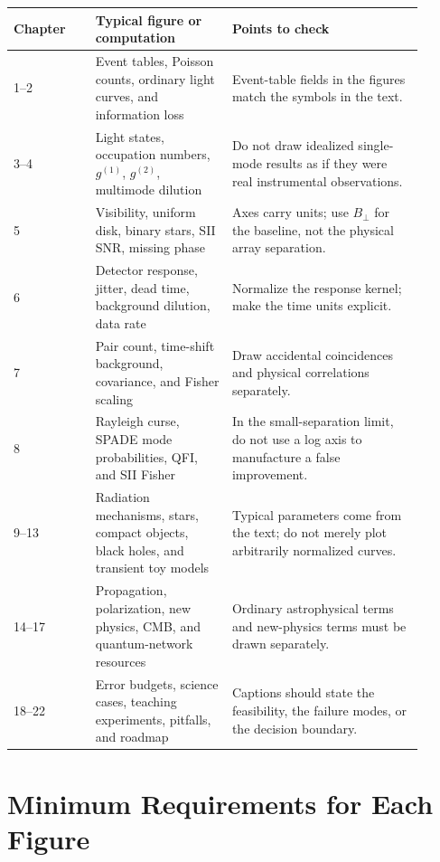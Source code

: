 \begin{longtable}{p{0.18\linewidth}p{0.30\linewidth}p{0.42\linewidth}}
\toprule
Chapter & Typical figure or computation & Points to check \\
\midrule
1--2 & Event tables, Poisson counts, ordinary light curves, and information loss & Event-table fields in the figures match the symbols in the text. \\
3--4 & Light states, occupation numbers, \(g^{(1)}\), \(g^{(2)}\), multimode dilution & Do not draw idealized single-mode results as if they were real instrumental observations. \\
5 & Visibility, uniform disk, binary stars, SII SNR, missing phase & Axes carry units; use \(B_\perp\) for the baseline, not the physical array separation. \\
6 & Detector response, jitter, dead time, background dilution, data rate & Normalize the response kernel; make the time units explicit. \\
7 & Pair count, time-shift background, covariance, and Fisher scaling & Draw accidental coincidences and physical correlations separately. \\
8 & Rayleigh curse, SPADE mode probabilities, QFI, and SII Fisher & In the small-separation limit, do not use a log axis to manufacture a false improvement. \\
9--13 & Radiation mechanisms, stars, compact objects, black holes, and transient toy models & Typical parameters come from the text; do not merely plot arbitrarily normalized curves. \\
14--17 & Propagation, polarization, new physics, CMB, and quantum-network resources & Ordinary astrophysical terms and new-physics terms must be drawn separately. \\
18--22 & Error budgets, science cases, teaching experiments, pitfalls, and roadmap & Captions should state the feasibility, the failure modes, or the decision boundary. \\
\bottomrule
\end{longtable}

\section{Minimum Requirements for Each Figure}
\label{appsec:e-figure-requirements}

